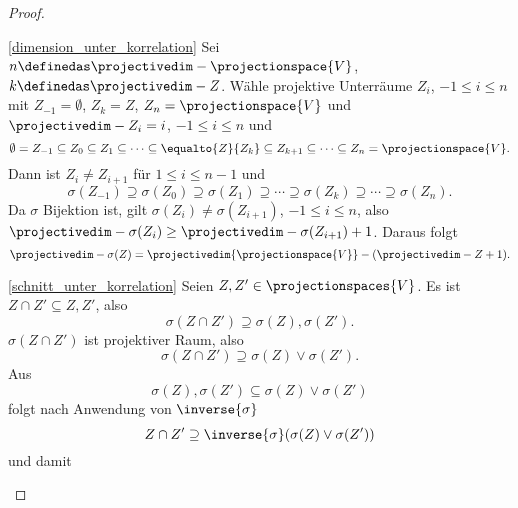 \begin{proof}
  \begin{proofdescription}
    \item[\ref{dimension_unter_korrelation}] Sei \( n\definedas \projectivedim-{\projectionspace{V}} \), \( k\definedas \projectivedim-{Z} \). Wähle projektive Unterräume \( Z_i \), \( -1\leq i\leq n \) mit \( Z_{-1}=\emptyset \), \( Z_k=Z \), \( Z_n=\projectionspace{V} \) und \( \projectivedim-{Z_i}=i \), \( -1\leq i\leq n \) und 
    \begin{equation*}
      \emptyset =Z_{-1}\subseteq Z_0\subseteq Z_1\subseteq \dotsb\subseteq \equalto{Z}{Z_k}\subseteq Z_{k+1}\subseteq\dotsb\subseteq Z_n=\projectionspace{V}.
    \end{equation*}
    Dann ist \( Z_i\neq Z_{i+1} \) für \( 1\leq i\leq n-1 \) und
    \begin{equation*}
      \sigma(Z_{-1})\supseteq \sigma(Z_0)\supseteq \sigma(Z_1)\supseteq \dotsb\supseteq \sigma(Z_k)\supseteq\dotsb\supseteq \sigma(Z_n).
    \end{equation*}
    Da \( \sigma \) Bijektion ist, gilt \( \sigma(Z_i)\neq \sigma(Z_{i+1}) \), \( -1\leq i\leq n \), also \( \projectivedim-{\sigma(Z_i)}\geq \projectivedim-{\sigma(Z_{i+1})}+1 \). Daraus folgt
    \begin{equation*}
      \projectivedim-{\sigma(Z)}=\projectivedim{\projectionspace{V}}-(\projectivedim-{Z}+1).
    \end{equation*}
    \item[\ref{schnitt_unter_korrelation}] Seien \( Z,Z'\in \projectionspaces{V} \). Es ist \( Z\cap Z'\subseteq Z,Z' \), also
    \begin{equation*}
      \sigma(Z\cap Z')\supseteq \sigma(Z),\sigma(Z').
    \end{equation*} \( 
      \sigma(Z\cap Z') \) ist projektiver Raum, also 
      \begin{equation*}
        \sigma(Z\cap Z')\supseteq \sigma(Z)\vee \sigma(Z').
      \end{equation*}
      Aus
      \begin{equation*}
        \sigma(Z),\sigma(Z')\subseteq \sigma(Z)\vee \sigma(Z')
      \end{equation*}
      folgt nach Anwendung von \( \inverse{\sigma} \)
      \begin{equation*}
        Z\cap Z'\supseteq \inverse{\sigma}(\sigma(Z)\vee \sigma(Z'))
      \end{equation*}
      und damit
      \begin{equation*}

\end{equation*}
\end{proofdescription}
\end{proof}
